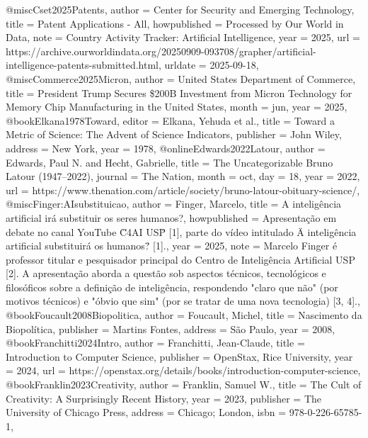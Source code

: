 @misc{Cset2025Patents,
  author       = {{Center for Security and Emerging Technology}},
  title        = {{Patent Applications - All}},
  howpublished = {Processed by Our World in Data},
  note         = {Country Activity Tracker: Artificial Intelligence},
  year         = {2025},
  url          = {https://archive.ourworldindata.org/20250909-093708/grapher/artificial-intelligence-patents-submitted.html},
  urldate      = {2025-09-18},
}
@misc{Commerce2025Micron,
  author       = {{United States Department of Commerce}},
  title        = {{President Trump Secures \$200B Investment from Micron Technology for Memory Chip Manufacturing in the United States}},
  month        = jun,
  year         = {2025},
}
@book{Elkana1978Toward,
  editor    = {Elkana, Yehuda et al.},
  title     = {{Toward a Metric of Science: The Advent of Science Indicators}},
  publisher = {John Wiley},
  address   = {New York},
  year      = {1978},
}
@online{Edwards2022Latour,
  author  = {Edwards, Paul N. and Hecht, Gabrielle},
  title   = {{The Uncategorizable Bruno Latour (1947--2022)}},
  journal = {{The Nation}},
  month   = oct,
  day     = {18},
  year    = {2022},
  url     = {https://www.thenation.com/article/society/bruno-latour-obituary-science/},
}
@misc{Finger:AIsubstituicao,
  author = {Finger, Marcelo},
  title = {A inteligência artificial irá substituir os seres humanos?},
  howpublished = {Apresentação em debate no canal YouTube {\"C4AI USP\"} [1], parte do vídeo intitulado {\"A inteligência artificial substituirá os humanos?\"} [1].},
  year = {2025},
  note = {Marcelo Finger é professor titular e pesquisador principal do Centro de Inteligência Artificial USP [2]. A apresentação aborda a questão sob aspectos técnicos, tecnológicos e filosóficos sobre a definição de inteligência, respondendo "claro que não" (por motivos técnicos) e "óbvio que sim" (por se tratar de uma nova tecnologia) [3, 4].},
}
@book{Foucault2008Biopolitica,
  author    = {Foucault, Michel},
  title     = {{Nascimento da Biopolítica}},
  publisher = {Martins Fontes},
  address   = {São Paulo},
  year      = {2008},
}
@book{Franchitti2024Intro,
  author    = {Franchitti, Jean-Claude},
  title     = {{Introduction to Computer Science}},
  publisher = {OpenStax, Rice University},
  year      = {2024},
  url       = {https://openstax.org/details/books/introduction-computer-science},
}
@book{Franklin2023Creativity,
  author    = {Franklin, Samuel W.},
  title     = {{The Cult of Creativity: A Surprisingly Recent History}},
  year      = {2023},
  publisher = {The University of Chicago Press},
  address   = {Chicago; London},
  isbn      = {978-0-226-65785-1},
}
